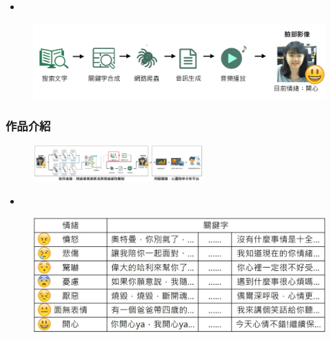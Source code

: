 \documentclass[10pt, conference, compsocconf]{beamer}
\begin{document}
\begin{CJK}{UTF8}{}
\begin{frame}
\vspace{-5mm}

\begin{itemize}
\item {}
\end{itemize}

\begin{figure}[!t]
\begin{center}
\includegraphics[width=12cm]{./Figures/FrameworkSecond.pdf}
\end{center}
\end{figure}
\end{frame}

\begin{frame}
\frametitle{作品介紹}

\vspace{-5mm}
\begin{figure}[t]
\begin{flushright}
\includegraphics[width=6.5cm]{./Figures/framework_version4_4.pdf}
\end{flushright}
\end{figure}

\vspace{-5mm}

\begin{itemize}
\item {}
\end{itemize}

\begin{figure}[!t]
\begin{center}
\includegraphics[width=12cm]{./Figures/505.jpg}
\end{center}
\end{figure}
\end{frame}


\end{CJK}
\end{document}
